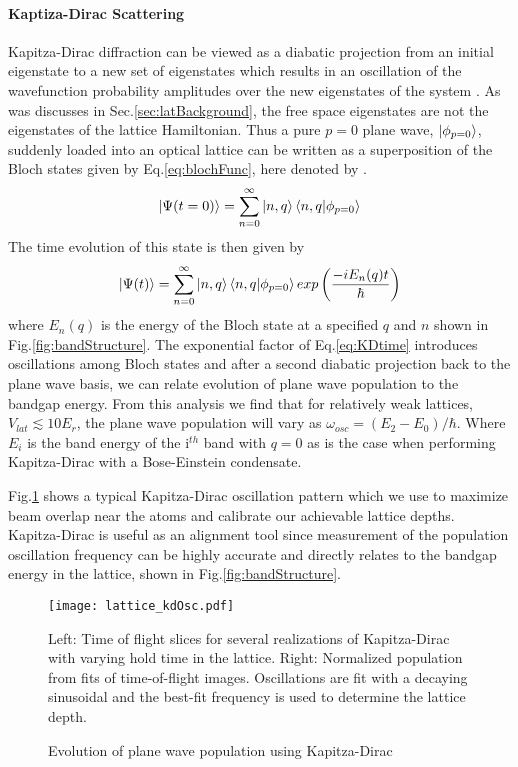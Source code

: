 \paragraph{Kaptiza-Dirac Scattering}
Kapitza-Dirac diffraction can be viewed as a diabatic projection from an initial eigenstate to a new set of eigenstates which results in an oscillation of the wavefunction probability amplitudes over the new eigenstates of the system \hl{\cite{Denschlag2002}}.
As was discusses in Sec.\;\ref{sec:latBackground}, the free space eigenstates are not the eigenstates of the lattice Hamiltonian. 
Thus a pure $p=0$ plane wave, $\left| {\phi_{p=0}} \right>$, suddenly loaded into an optical lattice can be written as a superposition of the Bloch states given by Eq.\;\ref{eq:blochFunc}, here denoted by .
	\begin{equation} \label{eq:p0inBloch}
		\left| {\Psi(t=0)} \right> = \sum_{n=0}^{\infty} \left| {n,q} \right> \left< {n,q} | {\phi_{p=0}} \right>
	\end{equation}
The time evolution of this state is then given by
	\begin{equation} \label{eq:KDtime}
		\left| {\Psi(t)} \right> = \sum_{n=0}^{\infty} \left| {n,q} \right> \left< {n,q} | {\phi_{p=0}} \right> exp \left( \frac{-i E_n(q) t}{\hbar} \right)
	\end{equation}
where $E_n(q)$ is the energy of the Bloch state at a specified $q$ and $n$ shown in Fig.\;\ref{fig:bandStructure}.
The exponential factor of Eq.\;\ref{eq:KDtime} introduces oscillations among Bloch states and after a second diabatic projection back to the plane wave basis, we can relate evolution of plane wave population to the bandgap energy.
From this analysis we find that for relatively weak lattices, $V_{lat} \lesssim 10 E_r$, the plane wave population will vary as $\omega_{osc} = (E_2 - E_0) / \hbar$.
Where $E_i$ is the band energy of the i$^{th}$ band with $q=0$ as is the case when performing Kapitza-Dirac with a Bose-Einstein condensate.

Fig.\;\ref{fig:KDoscillations} shows a typical Kapitza-Dirac oscillation pattern which we use to maximize beam overlap near the atoms and calibrate our achievable lattice depths. 
Kapitza-Dirac is useful as an alignment tool since measurement of the population oscillation frequency can be highly accurate and directly relates to the bandgap energy in the lattice, shown in Fig.\;\ref{fig:bandStructure}. 
	\begin{figure}
		\texttt{[image: lattice\_kdOsc.pdf]}
		\caption{Evolution of plane wave population using Kapitza-Dirac}{Left: Time of flight slices for several realizations of Kapitza-Dirac with varying hold time in the lattice. Right: Normalized population from fits of time-of-flight images. Oscillations are fit with a decaying sinusoidal and the best-fit frequency is used to determine the lattice depth.}
		 \label{fig:KDoscillations}
	\end{figure}
	
